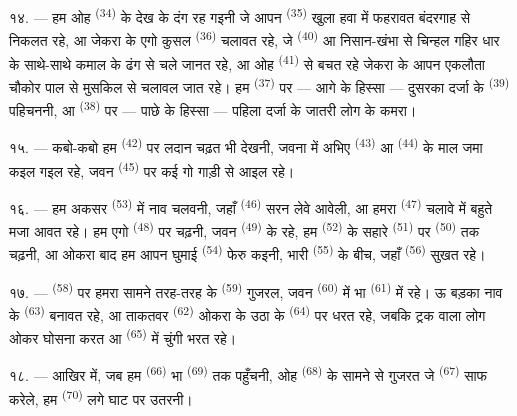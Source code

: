 \VUsaut{4.0mm}
\VUsaut{3.0mm}

१४. --- हम ओह  \textsuperscript{(34)} के देख के
दंग रह गइनी जे आपन  \textsuperscript{(35)} खुला हवा में
फहरावत बंदरगाह से निकलत रहे, आ जेकरा के एगो कुसल  \textsuperscript{(36)} चलावत रहे, जे 
\textsuperscript{(40)} आ निसान-खंभा से चिन्हल गहिर धार के साथे-साथे कमाल
के ढंग से चले जानत रहे, आ ओह  \textsuperscript{(41)} से
बचत रहे जेकरा के आपन एकलौता चौकोर पाल से मुसकिल से चलावल जात रहे। हम
 \textsuperscript{(37)} पर — आगे के हिस्सा — दुसरका दर्जा
के  \textsuperscript{(39)} पहिचननी, आ 
\textsuperscript{(38)} पर — पाछे के हिस्सा — पहिला दर्जा के जातरी लोग के
कमरा।

१५. --- कबो-कबो हम  \textsuperscript{(42)} पर लदान
चढ़त भी देखनी, जवना में अभिए  \textsuperscript{(43)} आ
 \textsuperscript{(44)} के माल जमा कइल गइल रहे,
जवन  \textsuperscript{(45)} पर कई गो गाड़ी से आइल
रहे।

\VUsaut{3.0mm}
\VUsaut{3.0mm}

१६. --- हम अकसर  \textsuperscript{(53)} में नाव
चलवनी, जहाँ  \textsuperscript{(46)} सरन लेवे आवेली, आ हमरा
 \textsuperscript{(47)} चलावे में बहुते मजा आवत रहे। हम एगो
 \textsuperscript{(48)} पर चढ़नी, जवन  \textsuperscript{(49)} के रहे, हम  \textsuperscript{(52)}
के सहारे  \textsuperscript{(51)} पर 
\textsuperscript{(50)} तक चढ़नी, आ ओकरा बाद हम आपन घुमाई  \textsuperscript{(54)} फेरु कइनी, भारी 
\textsuperscript{(55)} के बीच, जहाँ  \textsuperscript{(56)}
सुखत रहे।

१७. ---  \textsuperscript{(58)} पर हमरा सामने तरह-तरह के
 \textsuperscript{(59)} गुजरल, जवन 
\textsuperscript{(60)} में भा  \textsuperscript{(61)} में
रहे। ऊ बड़का नाव के  \textsuperscript{(63)} बनावत रहे, आ
ताकतवर  \textsuperscript{(62)} ओकरा के उठा के 
\textsuperscript{(64)} पर धरत रहे, जबकि ट्रक वाला लोग ओकर घोसना करत आ
 \textsuperscript{(65)} में चुंगी भरत रहे।

१८. --- आखिर में, जब हम  \textsuperscript{(66)} भा
 \textsuperscript{(69)} तक पहुँचनी, ओह  \textsuperscript{(68)} के सामने से गुजरत जे 
\textsuperscript{(67)} साफ करेले, हम 
\textsuperscript{(70)} लगे घाट पर उतरनी।

